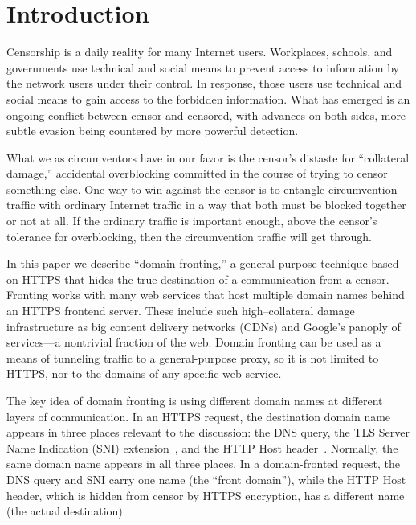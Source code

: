 \documentclass[conference]{IEEEtran}
\begin{document}
\section{Introduction}


Censorship is a daily reality for many Internet users.
Workplaces, schools, and governments use technical and social means
to prevent access to information by the network users under their control.
In response, those users use technical and social means
to gain access to the forbidden information.
What has emerged is an ongoing conflict between censor and censored,
with advances on both sides, more subtle evasion being countered by more powerful detection.

What we as circumventors have in our favor is the censor's
distaste for ``collateral damage,''
accidental overblocking committed in the course of trying to censor something else.
One way to win against the censor is to entangle circumvention traffic
with ordinary Internet traffic in a way that both must be blocked together
or not at all.
If the ordinary traffic is important enough,
above the censor's tolerance for overblocking,
then the circumvention traffic will get through.

In this paper we describe ``domain fronting,'' a general-purpose technique
based on HTTPS that hides the true destination of a communication
from a censor.
Fronting works with many web services that host multiple domain names
behind an HTTPS frontend server.
These include such high--collateral damage infrastructure as
big content delivery networks (CDNs)
and Google's panoply of services---a nontrivial fraction of the web.
Domain fronting can be used as a means of tunneling traffic
to a general-purpose proxy,
so it is not limited to HTTPS, nor to the domains of any specific web service.

The key idea of domain fronting is using
different domain names at different layers of communication.
In an HTTPS request, the destination domain name appears
in three places relevant to the discussion:
the DNS query,
the TLS Server Name Indication (SNI) extension~\cite[Section~3]{rfc6066},
and the HTTP Host header~\cite[Section~14.23]{rfc2616}.
Normally, the same domain name appears in all three places.
In a domain-fronted request,
the DNS query and SNI carry one name (the ``front domain''),
while the HTTP Host header,
which is hidden from censor by HTTPS encryption,
has a different name (the actual destination).
\end{document}
